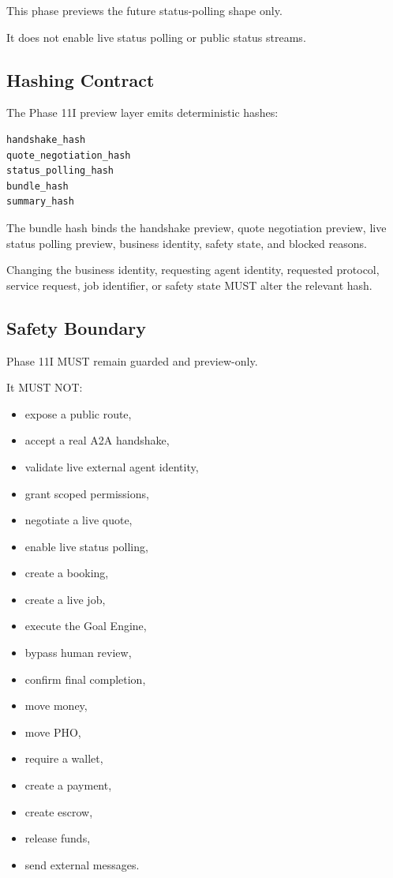 This phase previews the future status-polling shape only.

It does not enable live status polling or public status streams.

\subsection{Hashing Contract}

The Phase 11I preview layer emits deterministic hashes:

\begin{verbatim}
handshake_hash
quote_negotiation_hash
status_polling_hash
bundle_hash
summary_hash
\end{verbatim}

The bundle hash binds the handshake preview, quote negotiation preview, live status polling preview, business identity, safety state, and blocked reasons.

Changing the business identity, requesting agent identity, requested protocol, service request, job identifier, or safety state MUST alter the relevant hash.

\subsection{Safety Boundary}

Phase 11I MUST remain guarded and preview-only.

It MUST NOT:

\begin{itemize}
  \item expose a public route,
  \item accept a real A2A handshake,
  \item validate live external agent identity,
  \item grant scoped permissions,
  \item negotiate a live quote,
  \item enable live status polling,
  \item create a booking,
  \item create a live job,
  \item execute the Goal Engine,
  \item bypass human review,
  \item confirm final completion,
  \item move money,
  \item move PHO,
  \item require a wallet,
  \item create a payment,
  \item create escrow,
  \item release funds,
  \item send external messages.
\end{itemize}

